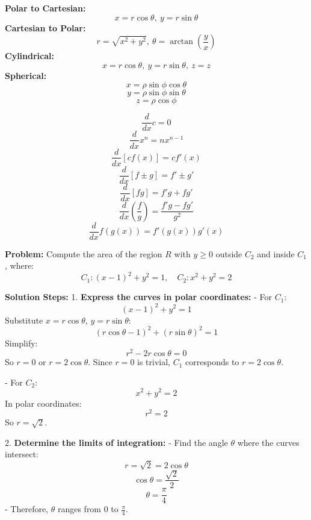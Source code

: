 \documentclass[9pt]{article}
\begin{document}
\begin{multicols}{2}
\begin{tcolorbox}[title=\textbf{Coordinate Transformations}, colframe=lightgreen]
\textbf{Polar to Cartesian:}
\[ x = r \cos \theta,\ y = r \sin \theta \]
\textbf{Cartesian to Polar:}
\[ r = \sqrt{x^2 + y^2},\ \theta = \arctan \left( \frac{y}{x} \right) \]
\textbf{Cylindrical:}
\[ x = r \cos \theta,\ y = r \sin \theta,\ z = z \]
\textbf{Spherical:}
\[ x = \rho \sin \phi \cos \theta \]
\[ y = \rho \sin \phi \sin \theta \]
\[ z = \rho \cos \phi \]
\end{tcolorbox}

\begin{tcolorbox}[title=\textbf{Derivative Rules}, colframe=lightblue]
\[ \frac{d}{dx} c = 0 \]
\[ \frac{d}{dx} x^n = nx^{n-1} \]
\[ \frac{d}{dx} [cf(x)] = c f'(x) \]
\[ \frac{d}{dx} [f \pm g] = f' \pm g' \]
\[ \frac{d}{dx} [fg] = f'g + fg' \]
\[ \frac{d}{dx} \left( \frac{f}{g} \right) = \frac{f'g - fg'}{g^2} \]
\[ \frac{d}{dx} f(g(x)) = f'(g(x)) g'(x) \]
\end{tcolorbox}

\begin{tcolorbox}[title=\textbf{Example: Computing Area Between Circles}, colframe=lightpink]
    \textbf{Problem:} Compute the area of the region \( R \) with \( y \geq 0 \) outside \( C_2 \) and inside \( C_1 \), where:
    \[ C_1: (x - 1)^2 + y^2 = 1, \quad C_2: x^2 + y^2 = 2 \]
    
    \textbf{Solution Steps:}
    1. \textbf{Express the curves in polar coordinates:}
       - For \( C_1 \):
         \[ (x - 1)^2 + y^2 = 1 \]
         Substitute \( x = r \cos \theta \), \( y = r \sin \theta \):
         \[ (r \cos \theta - 1)^2 + (r \sin \theta)^2 = 1 \]
         Simplify:
         \[ r^2 - 2 r \cos \theta = 0 \]
         So \( r = 0 \) or \( r = 2 \cos \theta \).
         Since \( r = 0 \) is trivial, \( C_1 \) corresponds to \( r = 2 \cos \theta \).
    
       - For \( C_2 \):
         \[ x^2 + y^2 = 2 \]
         In polar coordinates:
         \[ r^2 = 2 \]
         So \( r = \sqrt{2} \).
    
    2. \textbf{Determine the limits of integration:}
       - Find the angle \( \theta \) where the curves intersect:
         \[ r = \sqrt{2} = 2 \cos \theta \]
         \[ \cos \theta = \frac{\sqrt{2}}{2} \]
         \[ \theta = \frac{\pi}{4} \]
       - Therefore, \( \theta \) ranges from \( 0 \) to \( \frac{\pi}{4} \).
    

\end{tcolorbox}
\end{multicols}
\end{document}
